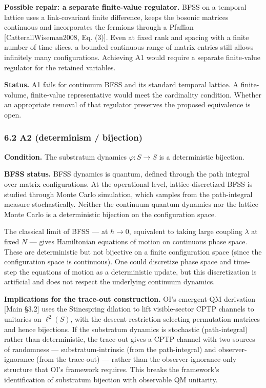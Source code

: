 \documentclass[
]{article}
\begin{document}
\textbf{Possible repair: a separate finite-value regulator.} BFSS on a
temporal lattice uses a link-covariant finite difference, keeps the
bosonic matrices continuous and incorporates the fermions through a
Pfaffian {[}CatterallWiseman2008, Eq. (3){]}. Even at fixed rank and
spacing with a finite number of time slices, a bounded continuous range
of matrix entries still allows infinitely many configurations. Achieving
A1 would require a separate finite-value regulator for the retained
variables.

\textbf{Status.} A1 fails for continuum BFSS and its standard temporal
lattice. A finite-volume, finite-value representative would meet the
cardinality condition. Whether an appropriate removal of that regulator
preserves the proposed equivalence is open.

\hypertarget{a2-determinism-bijection}{%
\subsubsection{6.2 A2 (determinism /
bijection)}\label{a2-determinism-bijection}}

\textbf{Condition.} The substratum dynamics \(\varphi: S \to S\) is a
deterministic bijection.

\textbf{BFSS status.} BFSS dynamics is quantum, defined through the path
integral over matrix configurations. At the operational level,
lattice-discretized BFSS is studied through Monte Carlo simulation,
which samples from the path-integral measure stochastically. Neither the
continuum quantum dynamics nor the lattice Monte Carlo is a
deterministic bijection on the configuration space.

The classical limit of BFSS --- at \(\hbar \to 0\), equivalent to taking
large coupling \(\lambda\) at fixed \(N\) --- gives Hamiltonian
equations of motion on continuous phase space. These are deterministic
but not bijective on a finite configuration space (since the
configuration space is continuous). One could discretize phase space and
time-step the equations of motion as a deterministic update, but this
discretization is artificial and does not respect the underlying
continuum dynamics.

\textbf{Implications for the trace-out construction.} OI's emergent-QM
derivation {[}Main §3.2{]} uses the Stinespring dilation to lift
visible-sector CPTP channels to unitaries on \(\ell^2(S)\), with the
descent restriction selecting permutation matrices and hence bijections.
If the substratum dynamics is stochastic (path-integral) rather than
deterministic, the trace-out gives a CPTP channel with two sources of
randomness --- substratum-intrinsic (from the path-integral) and
observer-ignorance (from the trace-out) --- rather than the
observer-ignorance-only structure that OI's framework requires. This
breaks the framework's identification of substratum bijection with
observable QM unitarity.
\end{document}

